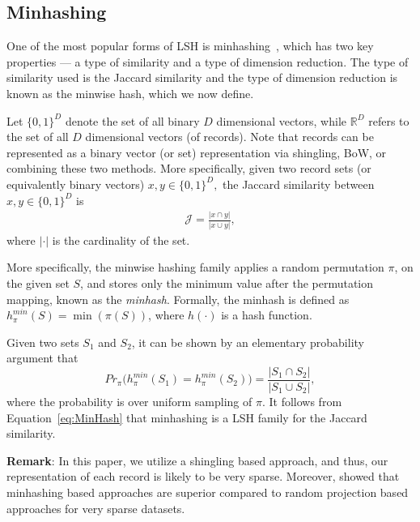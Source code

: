 \documentclass{imsart}
\begin{document}
\subsection{Minhashing}
One of the most popular forms of LSH is minhashing~\citep{Proc:Broder}, which has two key properties --- a type of similarity and a type of dimension reduction. The type of similarity used is the Jaccard similarity and the type of dimension reduction is known as the minwise hash, which we now define.

Let $\{0,1\}^D$ denote the set of all binary $D$ dimensional vectors, while $\mathbb{R}^D$ refers to the set of all $D$ dimensional vectors (of records). Note that records can be represented as a binary vector (or set) representation via shingling, BoW, or combining these two methods. More specifically, given two record sets (or equivalently binary vectors) $x,y \in \{0,1\}^D,$ the Jaccard similarity between $x, y \in \{0,1\}^D$  is\begin{align*}
\mathcal{J} = \frac{|x \cap y|}{|x \cup y|},
\end{align*}
where $|\cdot|$ is the cardinality of the set.

More specifically, the minwise hashing family applies a random permutation $\pi$, on the given set $S$, and stores only the minimum value after the permutation mapping, known as the \emph{minhash}.  Formally, the minhash is defined as $h_{\pi}^{min}(S) = \min(\pi(S))$, where $h(\cdot)$ is a hash function.

Given two sets $S_1$ and $S_2$, it can be shown by an elementary probability argument that
\begin{equation}
\label{eq:MinHash}
Pr_{\pi}({h_{\pi}^{min}(S_1) = h_{\pi}^{min}(S_2)) =  \frac{|S_1 \cap S_2|}{| S_1 \cup S_2|}},
\end{equation}
where the probability is over uniform sampling of $\pi$. It follows from Equation~\ref{eq:MinHash} that minhashing is a LSH family for the Jaccard similarity.

\textbf{Remark}: In this paper, we utilize a shingling based approach, and thus, our representation of each record is likely to be very sparse. Moreover, \cite{shrivastava2014defense} showed that minhashing based approaches are superior compared to random projection based approaches for very sparse datasets.
\end{document}
